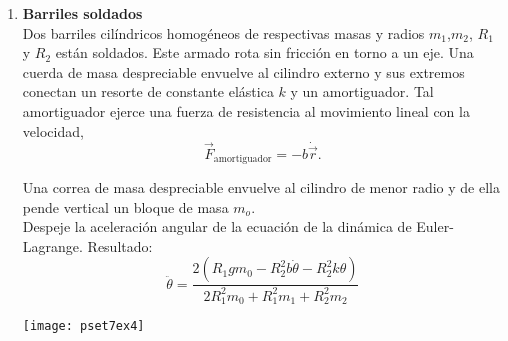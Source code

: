 \documentclass[11pt, spanish, a4paper, twoside]{article}
\begin{document}
\begin{enumerate}
\begin{minipage}[t][5.5cm]{0.6\textwidth}
Pregunta conceptual:
¿Cuales es la unidad de la fuerza generalizada?
\begin{tasks}(5)
	\task \si{\newton}
	\task \si{\newton \over \metre}
	\task \si{\newton \metre}
	\task Otra
\end{tasks}
Despeje la aceleración angular de la ecuación para la dinámica de Euler-Lagrange. Resultado:
\[
	\ddot{\theta} = \frac{K_{T} \theta + \tau}{L^{2} m \left(\sin^{2}{\left(\phi \right)} - 2\right)}
\] 
\end{minipage}
\begin{minipage}[c][1cm][t]{0.35\textwidth}
	\texttt{[image: pset7ex2]}
\end{minipage}



\item
\begin{minipage}[t][8cm]{0.6\textwidth}
\textbf{Barriles soldados}\\
Dos barriles cilíndricos homogéneos de respectivas masas y radios $m_1$,$m_2$, $R_1$ y $R_2$ están soldados.
Este armado rota sin fricción en torno a un eje.
Una cuerda de masa despreciable envuelve al cilindro externo y sus extremos conectan un resorte de constante elástica $k$ y un amortiguador.
Tal amortiguador ejerce una fuerza de resistencia al movimiento lineal con la velocidad,
$$
\vec{F}_\mathrm{amortiguador} = - b \dot{\vec{r}}.
$$

Una correa de masa despreciable envuelve al cilindro de menor radio y de ella pende vertical un bloque de masa $m_o$.\\
Despeje la aceleración angular de la ecuación de la dinámica de Euler-Lagrange. 
Resultado:\\
\[
	\ddot{\theta} = \frac{2 \left(R_{1} g m_{0} - R_{2}^{2} b \dot{\theta} - R_{2}^{2} k \theta\right)}{2 R_{1}^{2} m_{0} + R_{1}^{2} m_{1} + R_{2}^{2} m_{2}}
\]
\end{minipage}
\begin{minipage}[c][0cm][t]{0.35\textwidth}
	\texttt{[image: pset7ex4]}
\end{minipage}




\end{enumerate}
\end{document}
